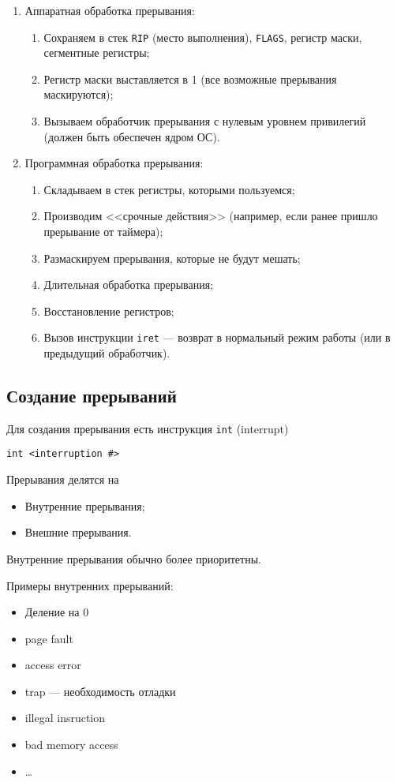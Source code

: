 \begin{enumerate}
\item Аппаратная обработка прерывания:
\begin{enumerate}
\item Сохраняем в стек \verb!RIP! (место выполнения), \verb!FLAGS!, регистр маски, сегментные регистры;
\item Регистр маски выставляется в 1 (все возможные прерывания маскируются);
\item Вызываем обработчик прерывания с нулевым уровнем привилегий (должен быть обеспечен ядром ОС).
\end{enumerate}
\item Программная обработка прерывания:
\begin{enumerate}
\item Складываем в стек регистры, которыми пользуемся;
\item Производим <<срочные действия>> (например, если ранее пришло прерывание от таймера);
\item Размаскируем прерывания, которые не будут мешать;
\item Длительная обработка прерывания;
\item Восстановление регистров;
\item Вызов инструкции \verb!iret! --- возврат в нормальный режим работы (или в предыдущий обработчик).
\end{enumerate}
\end{enumerate}

\subsection{Создание прерываний}
Для создания прерывания есть инструкция \verb!int! (interrupt)
\begin{verbatim}
int <interruption #>
\end{verbatim}

Прерывания делятся на
\begin{itemize}
\item Внутренние прерывания;
\item Внешние прерывания.
\end{itemize}

Внутренние прерывания обычно более приоритетны. 

Примеры внутренних прерываний:
\begin{itemize}
\item Деление на 0
\item page fault
\item access error
\item trap --- необходимость отладки
\item illegal insruction
\item bad memory access
\item \ldots
\end{itemize}

